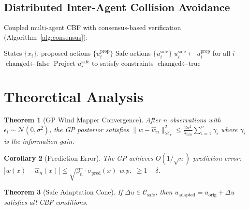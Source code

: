\documentclass[11pt,twocolumn]{article}
\newtheorem{theorem}{Theorem}[section]
\newtheorem{corollary}[theorem]{Corollary}
\theoremstyle{definition}
\newcommand{\N}{\mathcal{N}}
\newcommand{\cH}{\mathcal{H}}
\newcommand{\cC}{\mathcal{C}}
\begin{document}
\subsection{Distributed Inter-Agent Collision Avoidance}
\label{sec:collision_avoidance}
Coupled multi-agent CBF with consensus-based verification (Algorithm~\ref{alg:consensus}):
\begin{algorithm}[t]
\caption{Distributed Consensus Safety Verification}
\label{alg:consensus}
\begin{algorithmic}[1]
\REQUIRE States $\{x_i\}$, proposed actions $\{u_i^{\text{prop}}\}$
\ENSURE Safe actions $\{u_i^{\text{safe}}\}$
\STATE $u_i^{\text{safe}} \leftarrow u_i^{\text{prop}}$ for all $i$
    \STATE $\text{changed} \leftarrow \text{false}$
            \STATE Project $u_i^{\text{safe}}$ to satisfy constraints
            \STATE $\text{changed} \leftarrow \text{true}$
        \ENDIF
    \ENDFOR
     \RETURN \ENDIF
\ENDFOR
\end{algorithmic}
\end{algorithm}

\section{Theoretical Analysis}
\label{sec:theory}

\begin{theorem}[GP Wind Mapper Convergence]
\label{thm:gp_conv}
After $n$ observations with $\epsilon_i \sim \N(0, \sigma^2)$, the GP posterior satisfies $\|w - \hat{w}_n\|_{\cH_k}^2 \leq \frac{2\sigma^2}{\lambda_{\min}} \sum_{i=1}^n \gamma_i$ where $\gamma_i$ is the information gain.
\end{theorem}

\begin{corollary}[Prediction Error]
The GP achieves $O(1/\sqrt{n})$ prediction error: $|w(x) - \hat{w}_n(x)| \leq \sqrt{\beta_n} \cdot \sigma_{\text{pred}}(x)$ w.p.\ $\geq 1-\delta$.
\end{corollary}

\begin{theorem}[Safe Adaptation Cone]
\label{thm:safe_cone}
If $\Delta u \in \cC_{\text{safe}}$, then $u_{\text{adapted}} = u_{\text{orig}} + \Delta u$ satisfies all CBF conditions.
\end{theorem}
\end{document}
